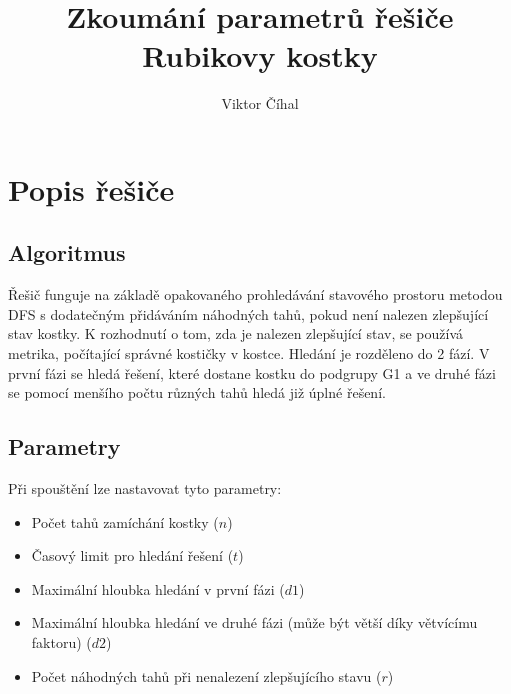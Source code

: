 \documentclass{article}
\title{Zkoumání parametrů řešiče Rubikovy kostky}
\author{Viktor Číhal}
\date{}
\begin{document}
\maketitle

\section*{Popis řešiče}
\subsection*{Algoritmus}
Řešič funguje na základě opakovaného prohledávání stavového prostoru metodou DFS s dodatečným přidáváním náhodných tahů, pokud není nalezen zlepšující
stav kostky. K rozhodnutí o tom, zda je nalezen zlepšující stav, se používá metrika, počítající správné kostičky v kostce. 
Hledání je rozděleno do 2 fází. V první fázi se hledá řešení, které dostane kostku do podgrupy G1 a ve druhé fázi se pomocí menšího počtu
různých tahů hledá již úplné řešení.

\subsection*{Parametry}
Při spouštění lze nastavovat tyto parametry:
\begin{itemize}
    \item Počet tahů zamíchání kostky ($n$)
    \item Časový limit pro hledání řešení ($t$)
    \item Maximální hloubka hledání v první fázi ($d1$)
    \item Maximální hloubka hledání ve druhé fázi (může být větší díky větvícímu faktoru) ($d2$)
    \item Počet náhodných tahů při nenalezení zlepšujícího stavu ($r$)
\end{itemize}
\end{document}
